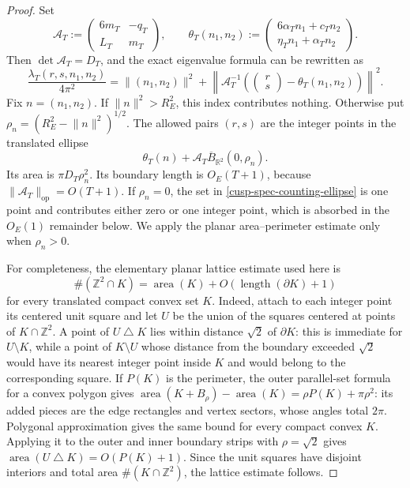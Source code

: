 \begin{proof}
Set
\begin{equation}
 \mathcal A_T:=\begin{pmatrix}6m_T&-q_T\\L_T&m_T\end{pmatrix},
 \qquad
 \theta_T(n_1,n_2):=
 \begin{pmatrix}6\alpha_Tn_1+c_Tn_2\\
                 \eta_Tn_1+\alpha_Tn_2\end{pmatrix}.
 \label{cusp-spec-counting-matrices}
\end{equation}
Then \(\det\mathcal A_T=D_T\), and the exact eigenvalue formula can be
rewritten as
\begin{equation}
 \frac{\lambda_T(r,s,n_1,n_2)}{4\pi^2}
 =\lVert(n_1,n_2)\rVert^2+
  \left\lVert\mathcal A_T^{-1}
  \left(\begin{pmatrix}r\\s\end{pmatrix}
       -\theta_T(n_1,n_2)\right)\right\rVert^2.
 \label{cusp-spec-counting-eigenvalue-form}
\end{equation}
Fix \(n=(n_1,n_2)\).  If \(\lVert n\rVert^2>R_E^2\), this index contributes
nothing.  Otherwise put
\(\rho_n=(R_E^2-\lVert n\rVert^2)^{1/2}\).  The allowed pairs
\((r,s)\) are the integer points in the translated ellipse
\begin{equation}
 \theta_T(n)+\mathcal A_T\overline B_{\mathbb R^2}(0,\rho_n).
 \label{cusp-spec-counting-ellipse}
\end{equation}
Its area is \(\pi D_T\rho_n^2\).  Its boundary length is \(O_E(T+1)\),
because \(\lVert\mathcal A_T\rVert_{\mathrm{op}}=O(T+1)\).
If \(\rho_n=0\), the set in \cref{cusp-spec-counting-ellipse} is one point
and contributes either zero or one integer point, which is absorbed in the
\(O_E(1)\) remainder below.  We apply the planar area--perimeter estimate only
when \(\rho_n>0\).

For completeness, the elementary planar lattice estimate used here is
\[
 \#(\mathbb Z^2\cap K)=\operatorname{area}(K)
 +O(\operatorname{length}(\partial K)+1)
\]
for every translated compact convex set \(K\).  Indeed, attach to each
integer point its centered unit square and let \(U\) be the union of the
squares centered at points of \(K\cap\mathbb Z^2\).  A point of
\(U\mathbin\triangle K\) lies within distance \(\sqrt2\) of
\(\partial K\): this is immediate for \(U\setminus K\), while a point of
\(K\setminus U\) whose distance from the boundary exceeded \(\sqrt2\) would
have its nearest integer point inside \(K\) and would belong to the
corresponding square.  If \(P(K)\) is the perimeter, the outer parallel-set
formula for a convex polygon gives
\(\operatorname{area}(K+B_\rho)-\operatorname{area}(K)
=\rho P(K)+\pi\rho^2\): its added pieces are the edge rectangles and vertex
sectors, whose angles total \(2\pi\).  Polygonal approximation gives the same
bound for every compact convex \(K\).  Applying it to the outer and inner
boundary strips with \(\rho=\sqrt2\) gives
\(\operatorname{area}(U\mathbin\triangle K)=O(P(K)+1)\).  Since the unit
squares have disjoint interiors and total area
\(\#(K\cap\mathbb Z^2)\), the lattice estimate follows.


\end{proof}
